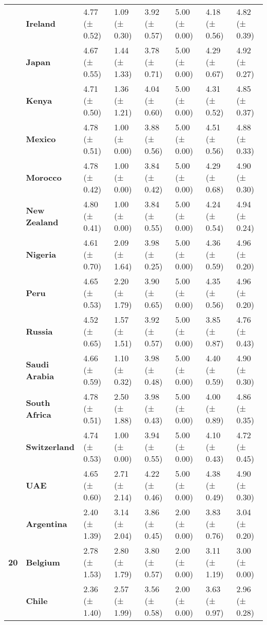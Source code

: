 \begin{longtable}{llllllll}
\textbf{} & \textbf{Ireland} & 4.77 (± 0.52) & 1.09 (± 0.30) & 3.92 (± 0.57) & 5.00 (± 0.00) & 4.18 (± 0.56) & 4.82 (± 0.39) \\
\textbf{} & \textbf{Japan} & 4.67 (± 0.55) & 1.44 (± 1.33) & 3.78 (± 0.71) & 5.00 (± 0.00) & 4.29 (± 0.67) & 4.92 (± 0.27) \\
\textbf{} & \textbf{Kenya} & 4.71 (± 0.50) & 1.36 (± 1.21) & 4.04 (± 0.60) & 5.00 (± 0.00) & 4.31 (± 0.52) & 4.85 (± 0.37) \\
\textbf{} & \textbf{Mexico} & 4.78 (± 0.51) & 1.00 (± 0.00) & 3.88 (± 0.56) & 5.00 (± 0.00) & 4.51 (± 0.56) & 4.88 (± 0.33) \\
\textbf{} & \textbf{Morocco} & 4.78 (± 0.42) & 1.00 (± 0.00) & 3.84 (± 0.42) & 5.00 (± 0.00) & 4.29 (± 0.68) & 4.90 (± 0.30) \\
\textbf{} & \textbf{New Zealand} & 4.80 (± 0.41) & 1.00 (± 0.00) & 3.84 (± 0.55) & 5.00 (± 0.00) & 4.24 (± 0.54) & 4.94 (± 0.24) \\
\textbf{} & \textbf{Nigeria} & 4.61 (± 0.70) & 2.09 (± 1.64) & 3.98 (± 0.25) & 5.00 (± 0.00) & 4.36 (± 0.59) & 4.96 (± 0.20) \\
\textbf{} & \textbf{Peru} & 4.65 (± 0.53) & 2.20 (± 1.79) & 3.90 (± 0.65) & 5.00 (± 0.00) & 4.35 (± 0.56) & 4.96 (± 0.20) \\
\textbf{} & \textbf{Russia} & 4.52 (± 0.65) & 1.57 (± 1.51) & 3.92 (± 0.57) & 5.00 (± 0.00) & 3.85 (± 0.87) & 4.76 (± 0.43) \\
\textbf{} & \textbf{Saudi Arabia} & 4.66 (± 0.59) & 1.10 (± 0.32) & 3.98 (± 0.48) & 5.00 (± 0.00) & 4.40 (± 0.59) & 4.90 (± 0.30) \\
\textbf{} & \textbf{South Africa} & 4.78 (± 0.51) & 2.50 (± 1.88) & 3.98 (± 0.43) & 5.00 (± 0.00) & 4.00 (± 0.89) & 4.86 (± 0.35) \\
\textbf{} & \textbf{Switzerland} & 4.74 (± 0.53) & 1.00 (± 0.00) & 3.94 (± 0.55) & 5.00 (± 0.00) & 4.10 (± 0.43) & 4.72 (± 0.45) \\
\textbf{} & \textbf{UAE} & 4.65 (± 0.60) & 2.71 (± 2.14) & 4.22 (± 0.46) & 5.00 (± 0.00) & 4.38 (± 0.49) & 4.90 (± 0.30) \\
\cline{1-8}
\multirow[t]{19}{*}{\textbf{20}} & \textbf{Argentina} & 2.40 (± 1.39) & 3.14 (± 2.04) & 3.86 (± 0.45) & 2.00 (± 0.00) & 3.83 (± 0.76) & 3.04 (± 0.20) \\
\textbf{} & \textbf{Belgium} & 2.78 (± 1.53) & 2.80 (± 1.79) & 3.80 (± 0.57) & 2.00 (± 0.00) & 3.11 (± 1.19) & 3.00 (± 0.00) \\
\textbf{} & \textbf{Chile} & 2.36 (± 1.40) & 2.57 (± 1.99) & 3.56 (± 0.58) & 2.00 (± 0.00) & 3.63 (± 0.97) & 2.96 (± 0.28) \\

\end{longtable}

